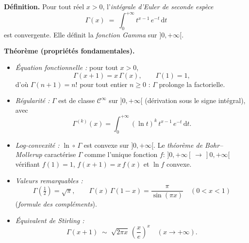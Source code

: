

\newcommand{\Gam}{\Gamma}
\newcommand{\intzi}{\int_0^{+\infty}}


\begin{tcolorbox}[thmbox]
  \textbf{Définition.}\enspace{}
  Pour tout réel $x>0$, l'\textit{intégrale d'Euler de seconde espèce}
  \[
    \Gam(x) \;=\; \intzi t^{x-1}\,e^{-t}\,\mathrm{d}t
  \]
  est convergente. Elle définit la \textit{fonction Gamma} sur $]0,+\infty[$.

  \medskip
  \textbf{Théorème (propriétés fondamentales).}
  \begin{itemize}
    \item \textit{Équation fonctionnelle :} pour tout $x>0$,
    \[
      \Gam(x+1) = x\,\Gam(x), \qquad \Gam(1)=1,
    \]
    d'où $\Gam(n+1)=n!$ pour tout entier $n\geq 0$ : $\Gam$ prolonge la
    factorielle.
    \item \textit{Régularité :} $\Gam$ est de classe $\mathcal{C}^\infty$ sur
    $]0,+\infty[$ (dérivation sous le signe intégral), avec
    \[
      \Gam^{(k)}(x) = \intzi {(\ln t)}^k\,t^{x-1}\,e^{-t}\,\mathrm{d}t.
    \]
    \item \textit{Log-convexité :} $\ln\circ\,\Gam$ est convexe sur
    $]0,+\infty[$. Le \textit{théorème de Bohr--Mollerup}
     caractérise $\Gam$ comme l'unique
    fonction $f:\,]0,+\infty[\,\to\,]0,+\infty[$ vérifiant $f(1)=1$,
    $f(x+1)=x\,f(x)$ et $\ln f$ convexe.
    \item \textit{Valeurs remarquables :}
    \[
      \Gam\!\left(\tfrac12\right)=\sqrt{\pi}, \qquad
      \Gam(x)\,\Gam(1-x)=\frac{\pi}{\sin(\pi x)} \quad (0<x<1)
    \]
    (\textit{formule des compléments}).
    \item \textit{Équivalent de Stirling :}
    \[
      \Gam(x+1) \;\sim\; \sqrt{2\pi x}\,{\left(\frac{x}{e}\right)}^{\!x}
      \quad (x\to+\infty).
    \]
  \end{itemize}
\end{tcolorbox}


